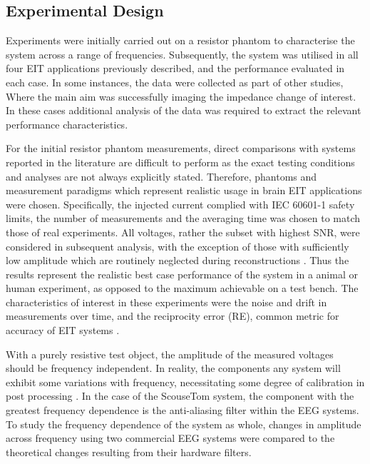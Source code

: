 \subsection{Experimental Design}

Experiments were initially carried out on a resistor phantom to characterise the system across a range of frequencies. Subsequently, the system was utilised in all four EIT applications previously described, and the performance evaluated in each case. In some instances, the data were collected as part of other studies, Where the main aim was successfully imaging the impedance change of interest. In these cases additional analysis of the data was required to extract the relevant performance characteristics.

For the initial resistor phantom measurements, direct comparisons with systems reported in the literature are difficult to perform as the exact testing conditions and analyses are not always explicitly stated.
Therefore, phantoms and measurement paradigms which represent realistic usage in brain EIT applications were chosen. Specifically, the injected current complied with IEC 60601-1 \cite{IEC} safety limits, the number of measurements and the averaging time was chosen to match those of real experiments. All voltages, rather the subset with highest SNR, were considered in subsequent analysis, with the exception of those with sufficiently low amplitude which are routinely neglected during reconstructions \cite{packham2012comparison}. Thus the results represent the realistic best case performance of the system in a animal or human experiment, as opposed to the maximum achievable on a test bench. The characteristics of interest in these experiments were the noise and drift in measurements over time, and the reciprocity error (RE), common metric for accuracy of EIT systems \cite{Hun_Wi_2014}. 

With a purely resistive test object, the amplitude of the measured voltages should be frequency independent. In reality, the components any system will exhibit some variations with frequency, necessitating some degree of calibration in post processing \cite{Hun_Wi_2014,McEwan_2006}. In the case of the ScouseTom system, the component with the greatest frequency dependence is the anti-aliasing filter within the EEG systems. To study the frequency dependence of the system as whole, changes in amplitude across frequency using two commercial EEG systems were compared to the theoretical changes resulting from their hardware filters. 

